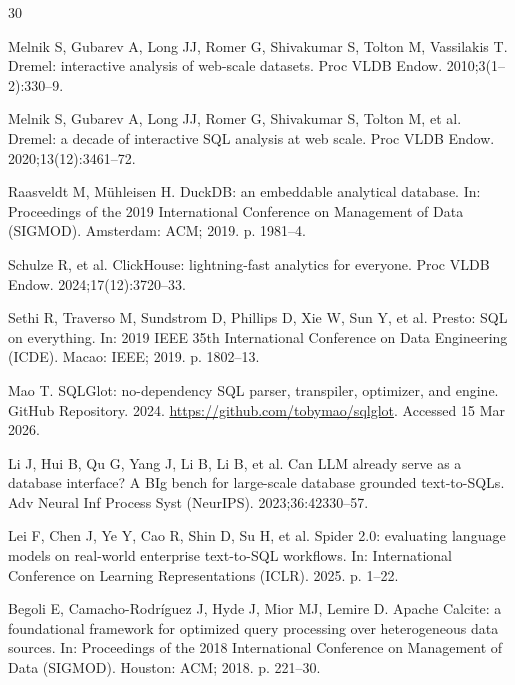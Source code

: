 \documentclass[10pt,a4paper]{article}
\begin{document}
\begin{thebibliography}{30}
\small

Melnik S, Gubarev A, Long JJ, Romer G, Shivakumar S, Tolton M, Vassilakis T. Dremel: interactive analysis of web-scale datasets. Proc VLDB Endow. 2010;3(1--2):330--9.

Melnik S, Gubarev A, Long JJ, Romer G, Shivakumar S, Tolton M, et al. Dremel: a decade of interactive SQL analysis at web scale. Proc VLDB Endow. 2020;13(12):3461--72.

Raasveldt M, M{\"u}hleisen H. DuckDB: an embeddable analytical database. In: Proceedings of the 2019 International Conference on Management of Data (SIGMOD). Amsterdam: ACM; 2019. p. 1981--4.

Schulze R, et al. ClickHouse: lightning-fast analytics for everyone. Proc VLDB Endow. 2024;17(12):3720--33.

Sethi R, Traverso M, Sundstrom D, Phillips D, Xie W, Sun Y, et al. Presto: SQL on everything. In: 2019 IEEE 35th International Conference on Data Engineering (ICDE). Macao: IEEE; 2019. p. 1802--13.

Mao T. SQLGlot: no-dependency SQL parser, transpiler, optimizer, and engine. GitHub Repository. 2024. \url{https://github.com/tobymao/sqlglot}. Accessed 15 Mar 2026.

Li J, Hui B, Qu G, Yang J, Li B, Li B, et al. Can LLM already serve as a database interface? A BIg bench for large-scale database grounded text-to-SQLs. Adv Neural Inf Process Syst (NeurIPS). 2023;36:42330--57.

Lei F, Chen J, Ye Y, Cao R, Shin D, Su H, et al. Spider 2.0: evaluating language models on real-world enterprise text-to-SQL workflows. In: International Conference on Learning Representations (ICLR). 2025. p. 1--22.

Begoli E, Camacho-Rodr{\'i}guez J, Hyde J, Mior MJ, Lemire D. Apache Calcite: a foundational framework for optimized query processing over heterogeneous data sources. In: Proceedings of the 2018 International Conference on Management of Data (SIGMOD). Houston: ACM; 2018. p. 221--30.


\end{thebibliography}
\end{document}
